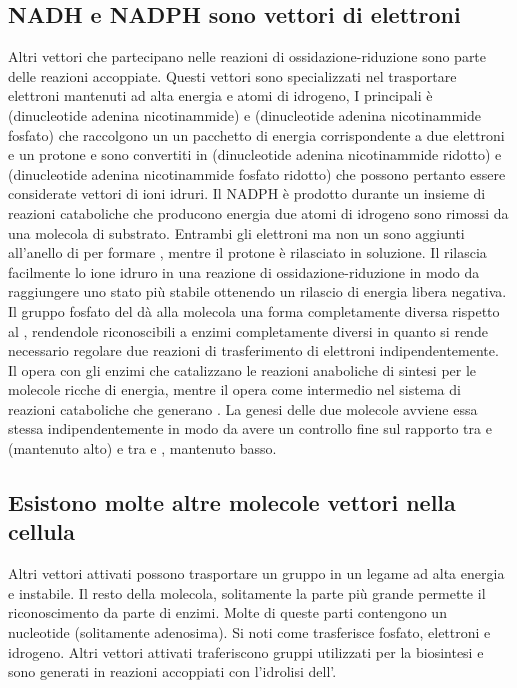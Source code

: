\subsection{NADH e NADPH sono vettori di elettroni}
Altri vettori che partecipano nelle reazioni di ossidazione-riduzione sono parte delle reazioni accoppiate. Questi vettori sono specializzati nel trasportare elettroni mantenuti ad
alta energia e atomi di idrogeno, I principali \`e  (dinucleotide adenina nicotinammide) e  (dinucleotide adenina nicotinammide fosfato) che raccolgono un un pacchetto
di energia corrispondente a due elettroni e un protone  e sono convertiti in  (dinucleotide adenina nicotinammide ridotto) e  (dinucleotide adenina 
nicotinammide fosfato ridotto) che possono pertanto essere considerate vettori di ioni idruri. Il NADPH \`e prodotto durante un insieme di reazioni cataboliche che producono energia 
due atomi di idrogeno sono rimossi da una molecola di substrato. Entrambi gli elettroni ma non un  sono aggiunti all'anello di  per formare , mentre il protone
 \`e rilasciato in soluzione. Il  rilascia facilmente lo ione idruro in una reazione di ossidazione-riduzione in modo da raggiungere uno stato pi\`u stabile ottenendo
un rilascio di energia libera negativa. Il gruppo fosfato del  d\`a alla molecola una forma completamente diversa rispetto al , rendendole riconoscibili a enzimi 
completamente diversi in quanto si rende necessario regolare due reazioni di trasferimento di elettroni indipendentemente. Il  opera con gli enzimi che catalizzano le reazioni 
anaboliche di sintesi per le molecole ricche di energia, mentre il  opera come intermedio nel sistema di reazioni cataboliche che generano . La genesi delle due molecole
avviene essa stessa indipendentemente in modo da avere un controllo fine sul rapporto tra  e  (mantenuto alto) e tra  e , mantenuto basso. 
\subsection{Esistono molte altre molecole vettori nella cellula}
Altri vettori attivati possono trasportare un gruppo in un legame ad alta energia e instabile. Il resto della molecola, solitamente la parte pi\`u grande permette il riconoscimento da
parte di enzimi. Molte di queste parti contengono un nucleotide (solitamente adenosima). Si noti come  trasferisce fosfato,  elettroni e idrogeno. Altri vettori 
attivati traferiscono gruppi utilizzati per la biosintesi e sono generati in reazioni accoppiati con l'idrolisi dell'.

